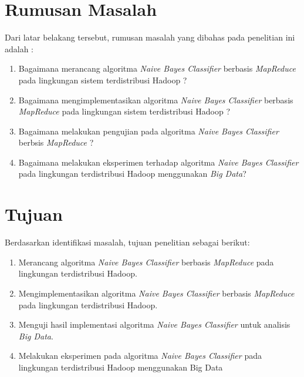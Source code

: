 \section{Rumusan Masalah}
Dari latar belakang tersebut, rumusan masalah yang dibahas pada penelitian ini adalah :
\begin{enumerate}
	\item Bagaimana merancang algoritma {\it Naive Bayes Classifier} berbasis \textit{MapReduce} pada lingkungan sistem terdistribusi Hadoop ?
	\item Bagaimana mengimplementasikan algoritma {\it Naive Bayes Classifier} berbasis \textit{MapReduce} pada lingkungan sistem terdistribusi Hadoop ?
	\item Bagaimana melakukan pengujian pada algoritma \textit{Naive Bayes Classifier} berbsis \textit{MapReduce} ?	
	\item Bagaimana melakukan eksperimen terhadap algoritma \textit{Naive Bayes Classifier} pada lingkungan terdistribusi Hadoop menggunakan \textit{Big Data}?
\end{enumerate}

\section{Tujuan}
Berdasarkan identifikasi masalah, tujuan penelitian sebagai berikut:
\begin{enumerate}
	\item Merancang algoritma \textit{Naive Bayes Classifier} berbasis \textit{MapReduce} pada lingkungan terdistribusi Hadoop.
	\item Mengimplementasikan algoritma \textit{Naive Bayes Classifier} berbasis \textit{MapReduce} pada lingkungan terdistribusi Hadoop.
	\item Menguji hasil implementasi algoritma \textit{Naive Bayes Classifier} untuk analisis \textit{Big Data}.
	\item Melakukan eksperimen pada algoritma \textit{Naive Bayes Classifier} pada lingkungan terdistribusi Hadoop menggunakan Big Data
\end{enumerate}

